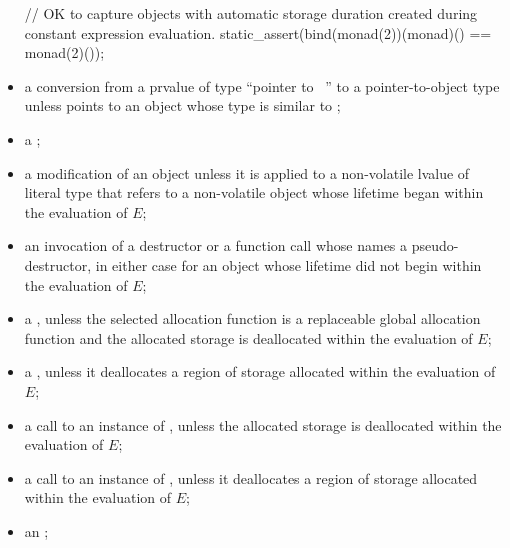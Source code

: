 \begin{itemize}
\begin{note}
\begin{example}
\begin{codeblock}
// OK to capture objects with automatic storage duration created during constant expression evaluation.
static_assert(bind(monad(2))(monad)() == monad(2)());
\end{codeblock}
\end{example}
\end{note}

\item
a conversion
from a prvalue  of type ``pointer to \cv{}~''
to a pointer-to-object type 
unless  points to an object whose type is similar to ;

\item
a ;

\item
a modification of an object
unless it is applied to a non-volatile lvalue of literal type
that refers to a non-volatile object
whose lifetime began within the evaluation of $E$;

\item
an invocation of a destructor or a function call
whose  names a pseudo-destructor,
in either case for an object whose lifetime did not begin within the evaluation of $E$;

\item
a ,
unless the selected allocation function is
a replaceable global allocation function and
the allocated storage is deallocated within the evaluation of $E$;

\item
a ,
unless it deallocates a region of storage
allocated within the evaluation of $E$;

\item
a call to an instance of
,
unless the allocated storage is deallocated within the evaluation of $E$;

\item
a call to an instance of
,
unless it deallocates a region of storage
allocated within the evaluation of $E$;

\item
an ;


\end{itemize}
